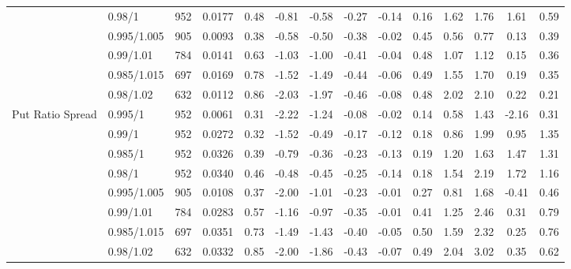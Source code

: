 \begin{tabular}{llcccccccccccc}
 & 0.98/1 & 952 & 0.0177 & 0.48 & -0.81 & -0.58 & -0.27 & -0.14 & 0.16 & 1.62 & 1.76 & 1.61 & 0.59 \\
 & 0.995/1.005 & 905 & 0.0093 & 0.38 & -0.58 & -0.50 & -0.38 & -0.02 & 0.45 & 0.56 & 0.77 & 0.13 & 0.39 \\
 & 0.99/1.01 & 784 & 0.0141 & 0.63 & -1.03 & -1.00 & -0.41 & -0.04 & 0.48 & 1.07 & 1.12 & 0.15 & 0.36 \\
 & 0.985/1.015 & 697 & 0.0169 & 0.78 & -1.52 & -1.49 & -0.44 & -0.06 & 0.49 & 1.55 & 1.70 & 0.19 & 0.35 \\
 & 0.98/1.02 & 632 & 0.0112 & 0.86 & -2.03 & -1.97 & -0.46 & -0.08 & 0.48 & 2.02 & 2.10 & 0.22 & 0.21 \\
Put Ratio Spread & 0.995/1 & 952 & 0.0061 & 0.31 & -2.22 & -1.24 & -0.08 & -0.02 & 0.14 & 0.58 & 1.43 & -2.16 & 0.31 \\
 & 0.99/1 & 952 & 0.0272 & 0.32 & -1.52 & -0.49 & -0.17 & -0.12 & 0.18 & 0.86 & 1.99 & 0.95 & 1.35 \\
 & 0.985/1 & 952 & 0.0326 & 0.39 & -0.79 & -0.36 & -0.23 & -0.13 & 0.19 & 1.20 & 1.63 & 1.47 & 1.31 \\
 & 0.98/1 & 952 & 0.0340 & 0.46 & -0.48 & -0.45 & -0.25 & -0.14 & 0.18 & 1.54 & 2.19 & 1.72 & 1.16 \\
 & 0.995/1.005 & 905 & 0.0108 & 0.37 & -2.00 & -1.01 & -0.23 & -0.01 & 0.27 & 0.81 & 1.68 & -0.41 & 0.46 \\
 & 0.99/1.01 & 784 & 0.0283 & 0.57 & -1.16 & -0.97 & -0.35 & -0.01 & 0.41 & 1.25 & 2.46 & 0.31 & 0.79 \\
 & 0.985/1.015 & 697 & 0.0351 & 0.73 & -1.49 & -1.43 & -0.40 & -0.05 & 0.50 & 1.59 & 2.32 & 0.25 & 0.76 \\
 & 0.98/1.02 & 632 & 0.0332 & 0.85 & -2.00 & -1.86 & -0.43 & -0.07 & 0.49 & 2.04 & 3.02 & 0.35 & 0.62 \\
\bottomrule
\end{tabular}
